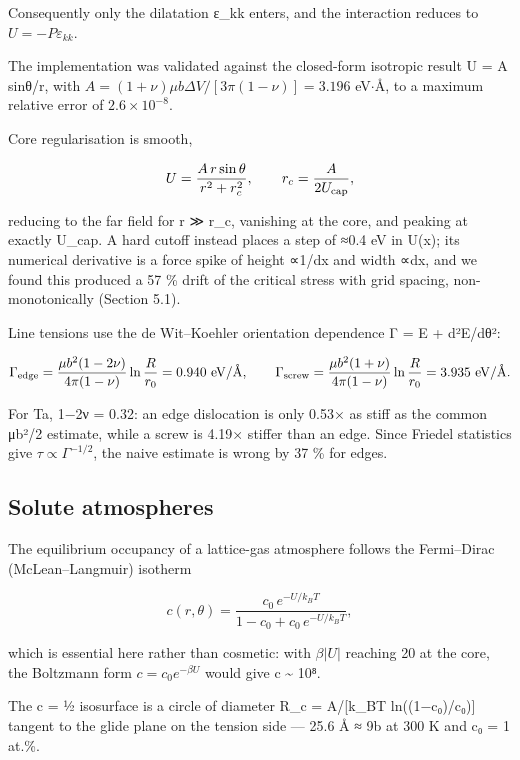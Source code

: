 \documentclass[11pt,a4paper]{article}
\begin{document}
Consequently only the dilatation ε\_kk enters, and the interaction reduces to \(U = -P\varepsilon_{kk}\).

The implementation was validated against the closed-form isotropic result U = A sinθ/r, with \(A = (1+\nu)\mu b\Delta V/[3\pi(1-\nu)] = 3.196\) eV\(\cdot\)\AA, to a maximum relative error of \textbf{\(2.6\times10^{-8}\)}.

Core regularisation is smooth,

\[U = \frac{A\,r\sin\theta}{r^2 + r_c^2},\qquad r_c = \frac{A}{2U_{\rm cap}},\]

reducing to the far field for r ≫ r\_c, vanishing at the core, and peaking at exactly U\_cap. A hard cutoff instead places a step of ≈0.4 eV in U(x); its numerical derivative is a force spike of height ∝1/dx and width ∝dx, and we found this produced a 57 \% drift of the critical stress with grid spacing, non-monotonically (Section 5.1).

Line tensions use the de Wit--Koehler orientation dependence \cite{dewit1959} Γ = E + d²E/dθ²:

\[\Gamma_{\rm edge} = \frac{\mu b^2(1-2\nu)}{4\pi(1-\nu)}\ln\frac{R}{r_0} = 0.940\ \text{eV/\AA},\qquad \Gamma_{\rm screw} = \frac{\mu b^2(1+\nu)}{4\pi(1-\nu)}\ln\frac{R}{r_0} = 3.935\ \text{eV/\AA}.\]

For Ta, 1−2ν = 0.32: an edge dislocation is only 0.53× as stiff as the common μb²/2 estimate, while a screw is 4.19× stiffer than an edge. Since Friedel statistics \cite{friedel1964} give \(\tau \propto \Gamma^{-1/2}\), the naive estimate is wrong by 37 \% for edges.

\hypertarget{solute-atmospheres}{%
\subsection{Solute atmospheres}\label{sec:solute-atmospheres}}

The equilibrium occupancy of a lattice-gas atmosphere follows the Fermi--Dirac (McLean--Langmuir) isotherm

\[c(r,\theta) = \frac{c_0\,e^{-U/k_BT}}{1 - c_0 + c_0\,e^{-U/k_BT}},\]

which is essential here rather than cosmetic: with \(\beta|U|\) reaching 20 at the core, the Boltzmann form \(c = c_0 e^{-\beta U}\) would give c \textasciitilde{} 10⁸.

The c = ½ isosurface is a circle of diameter R\_c = A/{[}k\_BT ln((1−c₀)/c₀){]} tangent to the glide plane on the tension side --- 25.6 Å ≈ 9b at 300 K and c₀ = 1 at.\%.
\end{document}
